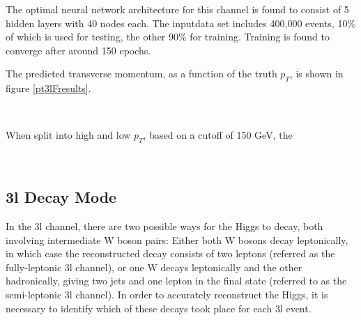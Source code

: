 

The optimal neural network architecture for this channel is found to consist of 5 hidden layers with 40 nodes each. The inputdata set includes 400,000 events, 10\% of which is used for testing, the other 90\% for training. Training is found to converge after around 150 epochs.

The predicted transverse momentum, as a function of the truth $p_T$, is shown in figure \ref{pt3lFresults}.
                                                                                                                             
\begin{figure}[h!]
    \\                     
    \caption{}
    \label{fig:pt3lFresults}
\end{figure}

When split into high and low $p_T$, based on a cutoff of 150 GeV, the 

\begin{figure}[h!]                                                                                                           
    \\
    \caption{}
    \label{fig:pt3lFroc}
\end{figure}

\subsection{3l Decay Mode}
\label{sec:decay3l}

In the 3l channel, there are two possible ways for the Higgs to decay, both involving intermediate W boson pairs: Either both W bosons decay leptonically, in which case the reconstructed decay consists of two leptons (referred as the fully-leptonic 3l channel), or one W decays leptonically and the other hadronically, giving two jets and one lepton in the final state (referred to as the semi-leptonic 3l channel). In order to accurately reconstruct the Higgs, it is necessary to identify which of these decays took place for each 3l event.

